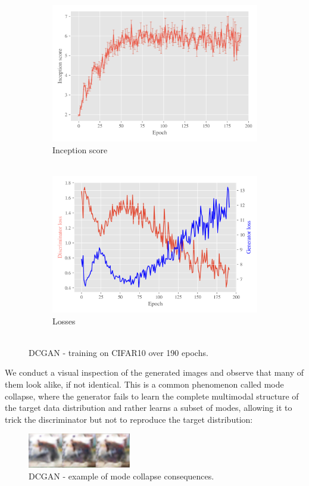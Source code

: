 \begin{figure}[H]
    \centering
    \begin{subfigure}[t]{0.49\textwidth}
        \centering
		\includegraphics[width=\textwidth]{../code/results/figures/dcgan_cifar10_is.png}
		\caption{Inception score\\~}
		\label{fig:exp-dcgan-is}
    \end{subfigure}
    \begin{subfigure}[t]{0.49\textwidth}
        \centering
        \includegraphics[width=\textwidth]{../code/results/figures/dcgan_cifar10_losses.png}
		\caption{Losses\\~}
		\label{fig:exp-dcgan-losses}
    \end{subfigure}
    \caption{DCGAN - training on CIFAR10 over 190 epochs.}
\end{figure}
We conduct a visual inspection of the generated images and observe that many of them look alike, if not identical. This is a common phenomenon called mode collapse, where the generator fails to learn the complete multimodal structure of the target data distribution and rather learns a subset of modes, allowing it to trick the discriminator but not to reproduce the target distribution:
\begin{figure}[H]
\centering
\includegraphics[width=0.4\textwidth]{../code/results/figures/images/mode-collapse}
\caption{DCGAN - example of mode collapse consequences.}
\end{figure}